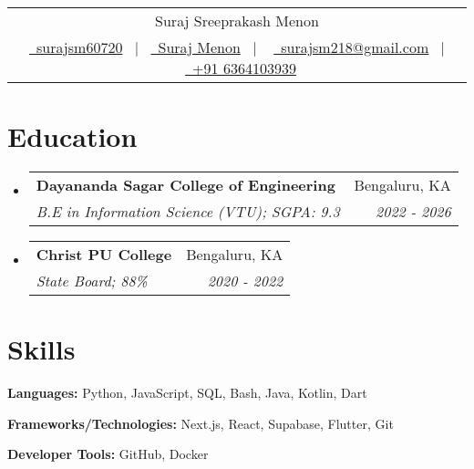 \documentclass[a4paper,12pt]{article}
\makeatletter
\newcommand{\resumeSubheading}[4]{
  \vspace{-1pt}\item
    \begin{tabular*}{0.97\textwidth}{l@{\extracolsep{\fill}}r}
      \textbf{#1} & #2 \\
      \textit{\small#3} & \textit{\small #4} \\
    \end{tabular*}\vspace{-5pt}
}
\newcommand{\resumeSubHeadingListStart}{\begin{itemize}[leftmargin=*]}
\newcommand{\resumeSubHeadingListEnd}{\end{itemize}}
\makeatother
\begin{document}
\pagestyle{empty}


\begin{tabularx}{\linewidth}{@{} C @{}}
	\Huge{Suraj Sreeprakash Menon}                                              \\[7.5pt]
	\href{https://github.com/surajsm60720}{\raisebox{-0.05\height}\faGithub\ surajsm60720} \ $|$ \
	\href{https://www.linkedin.com/in/suraj-menon-a581ab305/}{\raisebox{-0.05\height}\faLinkedin\ Suraj Menon} \ $|$ \
	\href{mailto:surajsm218@gmail.com}{\raisebox{-0.05\height}\faEnvelope \ surajsm218@gmail.com} \ $|$ \
	\href{tel:+916364103939}{\raisebox{-0.05\height}\faMobile \ +91 6364103939} \\
\end{tabularx}



\section{Education}
  \resumeSubHeadingListStart
    \resumeSubheading
      {Dayananda Sagar College of Engineering}{Bengaluru, KA}
      {B.E in Information Science (VTU);  SGPA: 9.3}{2022 - 2026}
    \resumeSubheading
      {Christ PU College}{Bengaluru, KA}
      {State Board;  88\%}{2020 - 2022}
  \resumeSubHeadingListEnd



\section{Skills}

\textbf{Languages:} Python, JavaScript, SQL, Bash, Java, Kotlin, Dart

\textbf{Frameworks/Technologies:} Next.js, React, Supabase, Flutter, Git

\textbf{Developer Tools:} GitHub, Docker
\end{document}
